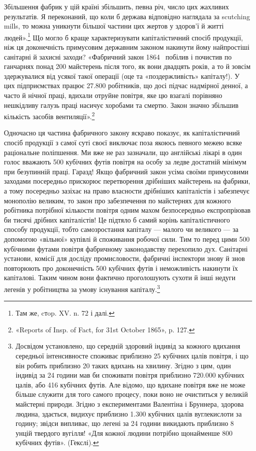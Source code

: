 \parcont{}  %
Збільшення фабрик у цій країні збільшить, певна річ, число цих
жахливих результатів. Я переконаний, що коли б держава відповідно наглядала за
scutching mills, то можна уникнути більшої частини цих жертов у здоров’ї й
житті людей».\footnote{
Там же, cтop. XV. n. 72 і далі.
} Що могло б краще характеризувати капіталістичний спосіб продукції, ніж
ця доконечність примусовим державним законом накинути йому
найпростіші санітарні й захисні заходи? «Фабричний закон 1864~
побілив і почистив по ганчарнях понад 200 майстерень після
того, як вони двадцять років, а то й зовсім здержувалися від
усякої такої операції (оце та «поздержливість» капіталу!). У цих
підприємствах працює \num{27.800} робітників, що досі підчас надмірної денної, а
часто й нічної праці, вдихали отруйне повітря,
яке цю взагалі порівняно нешкідливу галузь праці насичує
хоробами та смертю. Закон значно збільшив кількість засобів
вентиляції».\footnote{
«Reports of Insp. of Fact, for 31st October 1865», p. 127.
}

Одночасно ця частина фабричного закону яскраво показує, як
капіталістичний спосіб продукції з самої суті своєї виключає
поза якоюсь певного межею всяке раціональне поліпшення. Ми
вже не раз зазначали, що англійські лікарі в один голос вважають
500 кубічних футів повітря на особу за ледве достатній мінімум
при безупинній праці. Гаразд! Якщо фабричний закон усіма
своїми примусовими заходами посередньо прискорює перетворення дрібніших
майстерень на фабрики, а тому посередньо
зазіхає на право власности дрібніших капіталістів і забезпечує
монополію великим, то закон про забезпечення по майстернях
для кожного робітника потрібної кількости повітря одним махом
безпосередньо експропріював би тисячі дрібних капіталістів!
Це підтяло б самий корінь капіталістичного способу продукції,
тобто самозростання капіталу — малого чи великого — за допомогою «вільної»
купівлі й споживання робочої сили. Тим то
перед цими 500 кубічними футами повітря фабричному законодавству перехопило
дух. Санітарні установи, комісії для досліду промисловости, фабричні інспектори
знову й знов повторюють про доконечність 500
кубічних футів і неможливість накинути їх капіталові.
Таким чином вони фактично проголошують
сухоти й інші недуги легенів у робітництва за умову існування
капіталу.\footnote{
Досвідом установлено, що середній здоровий індивід за кожного
вдихання середньої інтенсивносте споживає приблизно 25 кубічних
цалів  повітря, і що він робить приблизно 20 таких вдихань на хвилину. Згідно з
цим, один індивід за 24 години мав би споживати повітря приблизно \num{720.000}
кубічних цалів, або 416 кубічних футів. Але
відомо, що вдихане повітря вже не може більше служити для того самого
процесу, поки воно не очиститься у великій майстерні природи. Згідно
з експериментами Валентіна і Бруннера, здорова людина, здається, видихує
приблизно \num{1.300} кубічних цалів вуглекислоти за годину; звідси
випливає, що легені за 24 години викидають приблизно 8 унцій твердого
вугілля! «Для кожної людини потрібно щонайменше 800 кубічних
футів». (Гекслі).
}
